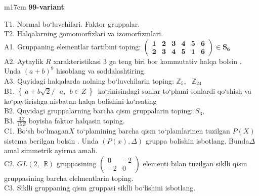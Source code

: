 \documentclass{article}
\begin{document}
\begin{tabular}{m{17cm}}
\textbf{99-variant}
\newline

T1. Normal bo`luvchilari. Faktor gruppalar. \\
T2. Halqalarning gomomorfizlari va izomorfizmlari. \\
A1. Gruppaning elementlar tartibini toping: \(\begin{pmatrix}
\mathbf{1} & \mathbf{2} & \mathbf{3} & \mathbf{4} & \mathbf{5} & \mathbf{6} \\
\mathbf{2} & \mathbf{3} & \mathbf{4} & \mathbf{5} & \mathbf{1} & \mathbf{6}
\end{pmatrix}\mathbf{\in}\mathbf{S}_{\mathbf{6}}\) \\
A2. Aytaylik \(R\) xarakteristikasi 3 ga teng biri bor kommutativ halqa bo\textquotesingle lsin . Unda \((a + b)^{9}\) hisoblang va soddalashtiring. \\
A3. Quyidagi halqalarda nolning bo`luvchilarin toping: \(\mathbb{Z}_{5},\ \ \ \mathbb{Z}_{24}\) \\
B1. \(\left\{ \left. \ a + b\sqrt{2}/\ \ \ a,\ \ b \in Z\  \right\} \right.\ \) ko`rinisindagi sonlar to`plami sonlardi qo`shish va ko`paytirishga nisbatan halqa bolishini ko`rsating \\
B2. Quyidagi gruppalarning barcha qism gruppalarin toping: \(S_{3},\) \\
B3. \(\frac{3Z}{15Z}\) boyisha faktor halqasin toping. \\
C1. Bo`sh bo`lmagan\(X\) to`plamining barcha qism to`plamlarinen tuzilgan \(P(X)\) sistema berilgan bo\textquotesingle lsin . Unda \((P(x),\Delta)\) gruppa bolishin isbotlang. Bunda\(\Delta\) amal simmetrik ayirma amali. \\
C2. \(GL(2,\mathbb{\ \ R})\) gruppasining \(\begin{pmatrix}
0 & - 2 \\
 - 2 & 0
\end{pmatrix}\) elementi bilan tuzilgan siklli qism gruppasining barcha elelmentlarin toping. \\
C3. Siklli gruppaning qism gruppasi siklli bo`lishini isbotlang. \\

\end{tabular}
\vspace{1cm}
\end{document}
